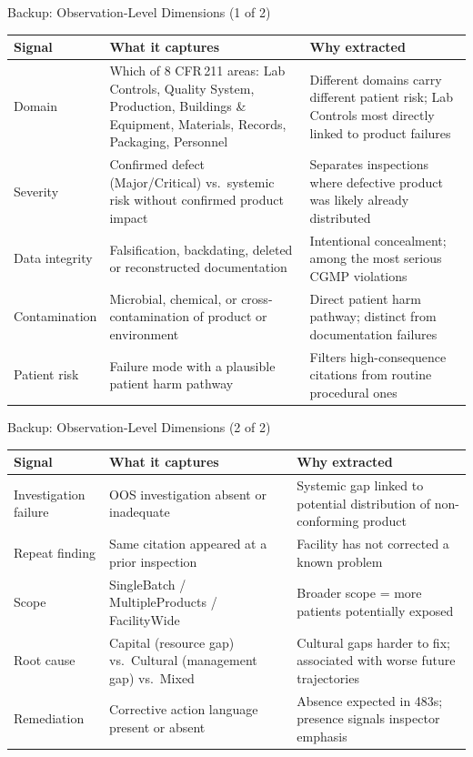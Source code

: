 \documentclass[aspectratio=169,10pt]{beamer}
\begin{document}
{
\begin{frame}{Backup: Observation-Level Dimensions (1 of 2)}
{\scriptsize\setlength{\tabcolsep}{4pt}
\begin{tabular}{p{1.5cm} p{3.8cm} p{3.8cm}}
\toprule
\textbf{Signal} & \textbf{What it captures} & \textbf{Why extracted} \\
\midrule
Domain & Which of 8 CFR\,211 areas: Lab Controls, Quality System, Production, Buildings \& Equipment, Materials, Records, Packaging, Personnel & Different domains carry different patient risk; Lab Controls most directly linked to product failures \\[3pt]
Severity & Confirmed defect (Major/Critical) vs.\ systemic risk without confirmed product impact & Separates inspections where defective product was likely already distributed \\[3pt]
Data integrity & Falsification, backdating, deleted or reconstructed documentation & Intentional concealment; among the most serious CGMP violations \\[3pt]
Contamination & Microbial, chemical, or cross-contamination of product or environment & Direct patient harm pathway; distinct from documentation failures \\[3pt]
Patient risk & Failure mode with a plausible patient harm pathway & Filters high-consequence citations from routine procedural ones \\
\bottomrule
\end{tabular}
}
\end{frame}
}

{
\begin{frame}{Backup: Observation-Level Dimensions (2 of 2)}
{\scriptsize\setlength{\tabcolsep}{4pt}
\begin{tabular}{p{1.5cm} p{3.8cm} p{3.8cm}}
\toprule
\textbf{Signal} & \textbf{What it captures} & \textbf{Why extracted} \\
\midrule
Investigation failure & OOS investigation absent or inadequate & Systemic gap linked to potential distribution of non-conforming product \\[3pt]
Repeat finding & Same citation appeared at a prior inspection & Facility has not corrected a known problem \\[3pt]
Scope & SingleBatch / MultipleProducts / FacilityWide & Broader scope = more patients potentially exposed \\[3pt]
Root cause & Capital (resource gap) vs.\ Cultural (management gap) vs.\ Mixed & Cultural gaps harder to fix; associated with worse future trajectories \\[3pt]
Remediation & Corrective action language present or absent & Absence expected in 483s; presence signals inspector emphasis \\
\bottomrule
\end{tabular}
}
\end{frame}
}
\end{document}
